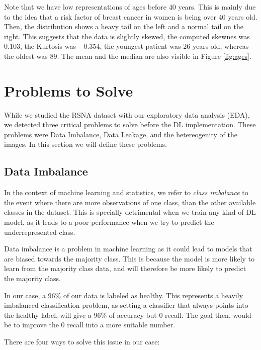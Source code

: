 \documentclass[conference]{IEEEtran}
\begin{document}
Note that we have low representations of ages before 40 years. This is mainly due to the idea that a risk factor of breast cancer in women is being over 40 years old. Then, the distribution shows a heavy tail on the left and a normal tail on the right. This suggests that the data is slightly skewed, the computed skewnes was $0.103$, the Kurtosis was $-0.354$, the youngest patient was 26 years old, whereas the oldest was 89. The mean and the median are also visible in Figure \ref{fig:ages}. 

\section{Problems to Solve}

While we studied the RSNA dataset with our exploratory data analysis (EDA), we detected three critical problems to solve before the DL implementation. These problems were Data Imbalance, Data Leakage, and the hetereogenity of the images. In this section we will define these problems. 

\subsection{Data Imbalance}

In the context of machine learning and statistics, we refer to \textit{class imbalance} to the event where there are more observations of one class, than the other available classes in the dataset. This is specially detrimental when we train any kind of DL model, as it leads to a poor performance when we try to predict the underrepresented class. 

Data imbalance is a problem in machine learning as it could lead to models that are biased towards the majority class. This is because the model is more likely to learn from the majority class data, and will therefore be more likely to predict the majority class.

In our case, a 96\% of our data is labeled as healthy. This represents a heavily imbalanced classification problem, as setting a classifier that always points into the healthy label, will give a 96\% of accuracy but 0 recall. The goal then, would be to improve the 0 recall into a more suitable number. 

There are four ways to solve this issue in our case: 
\end{document}
